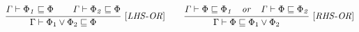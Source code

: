  \begin{gather*}
\frac{ \begin{matrix}
    \text{\code{\Gamma \vdash  \effect_1 \CONTAIN  \effect  \qquad \Gamma \vdash \effect_2 \CONTAIN  \effect}}
  \end{matrix}}{\Gamma \vdash  \effect_1 \vee \effect_2 \CONTAIN  \effect}\  \code{[LHS\text{-}OR]}
\qquad
\frac{ \begin{matrix}
    \text{\code{\Gamma \vdash  \effect \CONTAIN  \effect_1  \quad or \quad \Gamma \vdash \effect \CONTAIN  \effect_2}}
  \end{matrix}}{\Gamma \vdash    \effect \CONTAIN \effect_1 \vee \effect_2}\  \code{[RHS\text{-}OR]}
\end{gather*}


